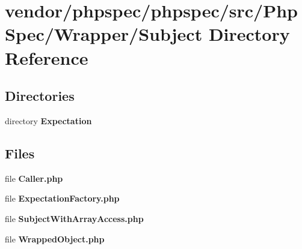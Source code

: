 \section{vendor/phpspec/phpspec/src/\+Php\+Spec/\+Wrapper/\+Subject Directory Reference}
\label{dir_62cbb4f85e21ec3a1ff2a0d40c03fc2f}
\subsection*{Directories}
\begin{DoxyCompactItemize}
\item 
directory {\bf Expectation}
\end{DoxyCompactItemize}
\subsection*{Files}
\begin{DoxyCompactItemize}
\item 
file {\bf Caller.\+php}
\item 
file {\bf Expectation\+Factory.\+php}
\item 
file {\bf Subject\+With\+Array\+Access.\+php}
\item 
file {\bf Wrapped\+Object.\+php}
\end{DoxyCompactItemize}
